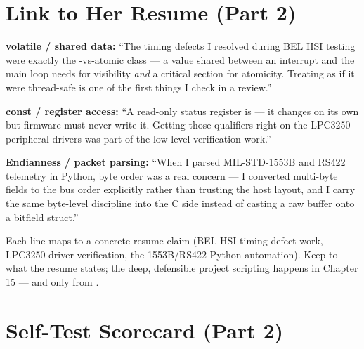 \section{Link to Her Resume (Part 2)}

\begin{resumelink}
\textbf{volatile / shared data:} ``The timing defects I resolved during BEL
HSI testing were exactly the -vs-atomic class --- a value
shared between an interrupt and the main loop needs  for
visibility \emph{and} a critical section for atomicity. Treating
 as if it were thread-safe is one of the first things I check
in a review.''

\medskip
\textbf{const / register access:} ``A read-only status register is
 --- it changes on its own but firmware must never write
it. Getting those qualifiers right on the LPC3250 peripheral drivers was part
of the low-level verification work.''

\medskip
\textbf{Endianness / packet parsing:} ``When I parsed MIL-STD-1553B and RS422
telemetry in Python, byte order was a real concern --- I converted multi-byte
fields to the bus order explicitly rather than trusting the host layout, and I
carry the same byte-level discipline into the C side instead of casting a raw
buffer onto a bitfield struct.''

\medskip
\small Each line maps to a concrete resume claim (BEL HSI timing-defect work,
LPC3250 driver verification, the 1553B/RS422 Python automation). Keep to what
the resume states; the deep, defensible project scripting happens in
Chapter 15 --- and only from .
\end{resumelink}

\section{Self-Test Scorecard (Part 2)}

